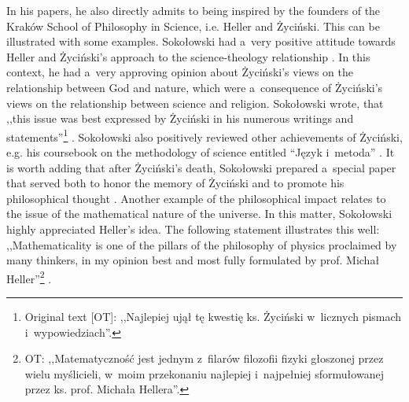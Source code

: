 In his papers, he also directly admits to being inspired by the founders of the Kraków School of Philosophy in Science, i.e. Heller and Życiński. This can be illustrated with some examples. Sokołowski had a~very positive attitude towards Heller and Życiński's approach to the science-theology relationship 
\parencite[][]{}. %
 In this context, he had a~very approving opinion about Życiński's views on the relationship between God and nature, which were a~consequence of Życiński's views on the relationship between science and religion. Sokołowski wrote, that ,,this issue was best expressed by Życiński in his numerous writings and statements''\footnote{Original text [OT]: ,,Najlepiej ujął tę kwestię ks. Życiński w~licznych pismach i~wypowiedziach''.} 
\parencite[][p.187]{}. %
 Sokołowski also positively reviewed other achievements of Życiński, e.g. his coursebook on the methodology of science entitled ``Język i~metoda'' 
\parencite[][]{}. %
 It is worth adding that after Życiński's death, Sokołowski prepared a~special paper that served both to honor the memory of Życiński and to promote his philosophical thought 
\parencite[][]{}. %
 Another example of the philosophical impact relates to the issue of the mathematical nature of the universe. In this matter, Sokołowski highly appreciated Heller's idea. The following statement illustrates this well: ,,Mathematicality is one of the pillars of the philosophy of physics proclaimed by many thinkers, in my opinion best and most fully formulated by prof. Michał Heller''\footnote{OT: ,,Matematyczność jest jednym z~filarów filozofii fizyki głoszonej przez wielu myślicieli, w~moim przekonaniu najlepiej i~najpełniej sformułowanej przez ks. prof. Michała Hellera''.} 
\parencite[][p.47]{}.%




